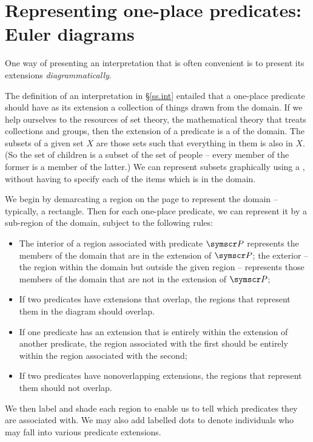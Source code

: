 \section{Representing one-place predicates: Euler diagrams}\label{euler}

One way of presenting an interpretation that is often convenient is to present its extensions \emph{diagrammatically}.

The definition of an interpretation in §\ref{ss.int} entailed that a one-place predicate should have as its extension a collection of things drawn from the domain. If we help ourselves to the resources of set theory, the mathematical theory that treats collections and groups, then the extension of a predicate is a  of the domain. The subsets of a given set $X$ are those sets such that everything in them is also in $X$. (So the set of children is a subset of the set of people – every member of the former is a member of the latter.) We can represent subsets graphically using a , without having to specify each of the items which is in the domain.

We begin by demarcating a region on the page to represent the domain – typically, a rectangle. Then for each one-place predicate, we can represent it by a sub-region of the domain, subject to the following rules: \begin{itemize}
\item The interior of a region associated with predicate $\meta{P}$ represents the members of the domain that are in the extension of $\meta{P}$; the exterior – the region within the domain but outside the given region – represents those members of the domain that are not in the extension of $\meta{P}$;
	\item If two predicates have extensions that overlap, the regions that represent them in the diagram should overlap.
	\item If one predicate has an extension that is entirely within the extension of another predicate, the region associated with the first should be entirely within the region associated with the second;
	\item If two predicates have nonoverlapping extensions, the regions that represent them should not overlap.
\end{itemize} We then label and shade each region to enable us to tell which predicates they are associated with. We may also add labelled dots to denote individuals who may fall into various predicate extensions.

